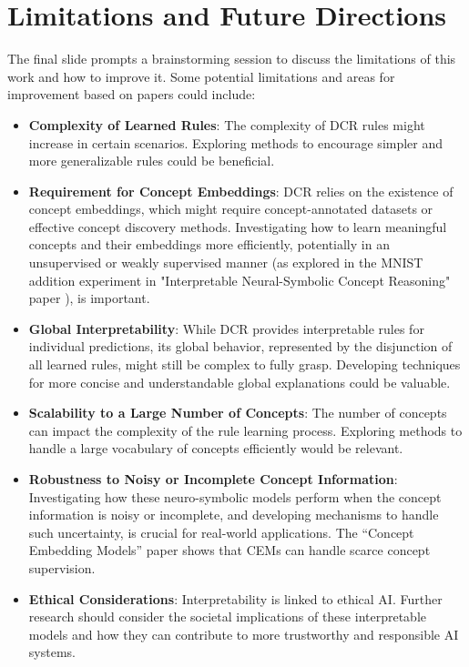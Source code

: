 \documentclass[10pt, oneside]{article}
\begin{document}
\section{Limitations and Future Directions}
The final slide prompts a brainstorming session to discuss the limitations of this work and how to improve it. Some potential limitations and areas for improvement based on papers could include:

\begin{itemize}
   \item \textbf{Complexity of Learned Rules}: The complexity of DCR rules might increase in certain scenarios. Exploring methods to encourage simpler and more generalizable rules could be beneficial.
   \item \textbf{Requirement for Concept Embeddings}: DCR relies on the existence of concept embeddings, which might require concept-annotated datasets or effective concept discovery methods. Investigating how to learn meaningful concepts and their embeddings more efficiently, potentially in an unsupervised or weakly supervised manner (as explored in the MNIST addition experiment in "Interpretable Neural-Symbolic Concept Reasoning" paper \cite{dcr}), is important.
   \item \textbf{Global Interpretability}: While DCR provides interpretable rules for individual predictions, its global behavior, represented by the disjunction of all learned rules, might still be complex to fully grasp. Developing techniques for more concise and understandable global explanations could be valuable.
   \item \textbf{Scalability to a Large Number of Concepts}: The number of concepts can impact the complexity of the rule learning process. Exploring methods to handle a large vocabulary of concepts efficiently would be relevant.
   \item \textbf{Robustness to Noisy or Incomplete Concept Information}: Investigating how these neuro-symbolic models perform when the concept information is noisy or incomplete, and developing mechanisms to handle such uncertainty, is crucial for real-world applications. The ``Concept Embedding Models'' paper \cite{cem} shows that CEMs can handle scarce concept supervision.
   \item \textbf{Ethical Considerations}: Interpretability is linked to ethical AI. Further research should consider the societal implications of these interpretable models and how they can contribute to more trustworthy and responsible AI systems.
\end{itemize}
\end{document}
